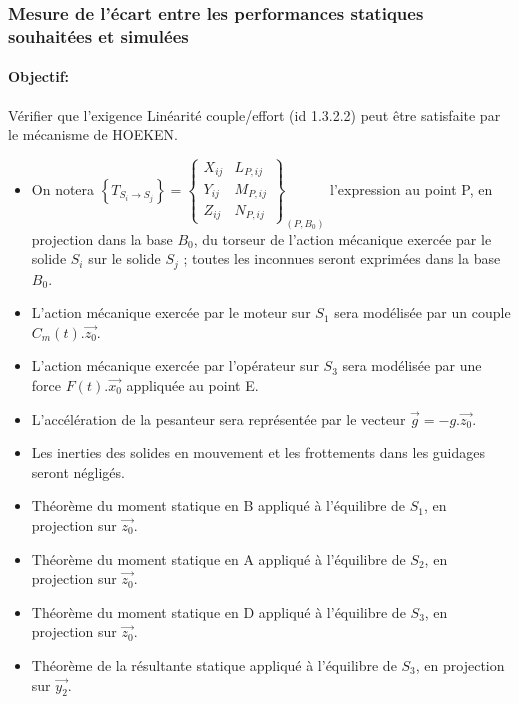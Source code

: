 
\subsubsection{Mesure de l'écart entre les performances statiques souhaitées et simulées}

\paragraph{Objectif: }Vérifier que l'exigence \og Linéarité couple/effort \fg (id 1.3.2.2) peut être satisfaite par le mécanisme de HOEKEN.

\begin{itemize}
 \item On notera $\left\{T_{S_i\rightarrow S_j}\right\}=\left\{\begin{array}{cc}
 X_{ij} & L_{P,ij} \\
 Y_{ij} & M_{P,ij} \\
 Z_{ij} & N_{P,ij}
 \end{array}\right\}_{(P,B_0)}$ l'expression au point P, en projection dans la base $B_0$, du torseur de l'action mécanique exercée par le solide $S_i$ sur le solide $S_j$ ; toutes
les inconnues seront exprimées dans la base $B_0$.
 \item L'action mécanique exercée par le moteur sur $S_1$ sera modélisée par un couple $C_m(t).\overrightarrow{z_0}$.
 \item L'action mécanique exercée par l'opérateur sur $S_3$ sera modélisée par une force $F(t).\overrightarrow{x_0}$ appliquée au point E.
 \item L'accélération de la pesanteur sera représentée par le vecteur $\overrightarrow{g} = -g.\overrightarrow{z_0}$.
 \item Les inerties des solides en mouvement et les frottements dans les guidages seront négligés.
\end{itemize}

\begin{itemize}
 \item Théorème du moment statique en B appliqué à l'équilibre de $S_1$, en projection sur $\overrightarrow{z_0}$.
 \item Théorème du moment statique en A appliqué à l'équilibre de $S_2$, en projection sur $\overrightarrow{z_0}$.
 \item Théorème du moment statique en D appliqué à l'équilibre de $S_3$, en projection sur $\overrightarrow{z_0}$.
 \item Théorème de la résultante statique appliqué à l'équilibre de $S_3$, en projection sur $\overrightarrow{y_2}$.
\end{itemize}

